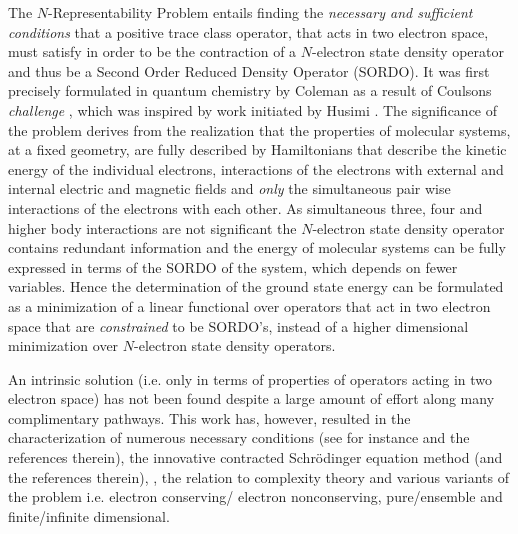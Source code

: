 \documentclass[aps,preprint,amsfonts,amssymb,showpacs,showkeys]{revtex4}%
\begin{document}
The $N$-Representability Problem entails finding the \emph{necessary and
sufficient conditions} that a positive trace class operator, that acts in two
electron space, must satisfy in order to be the contraction of a $N$-electron
state density operator and thus be a Second Order Reduced Density Operator
(SORDO). It was first precisely formulated in quantum chemistry by Coleman
\cite{Coleman63} as a result of Coulsons \emph{challenge }\cite{Coleman2000},
which was inspired by work initiated by Husimi \cite{Husimi}. The significance
of the problem derives from the realization that the properties of molecular
systems, at a fixed geometry, are fully described by Hamiltonians that
describe the kinetic energy of the individual electrons, interactions of the
electrons with external and internal electric and magnetic fields and
\emph{only }the simultaneous pair wise interactions of the electrons with each
other. As simultaneous three, four and higher body interactions are not
significant the $N$-electron state density operator contains redundant
information and the energy of molecular systems can be fully expressed in
terms of the SORDO of the system, which depends on fewer variables. Hence the
determination of the ground state energy can be formulated as a minimization
of a linear functional over operators that act in two electron space that are
\emph{constrained} to be SORDO's, instead of a higher dimensional minimization
over $N$-electron state density operators.

An intrinsic solution (i.e. only in terms of properties of operators acting in
two electron space) has not been found despite a large amount of effort
\cite{Mazziotti2007} along many complimentary pathways. This work has,
however, resulted in the characterization of numerous necessary conditions
(see for instance \cite{Mazziotti2007} and the references therein), the
innovative contracted Schr\"{o}dinger equation method \cite{Mazziotti} (and
the references therein), \cite{Valdemoro}, the relation to complexity theory
\cite{NPhard} and various variants of the problem i.e. electron conserving/
electron nonconserving, pure/ensemble and finite/infinite dimensional.
\end{document}
